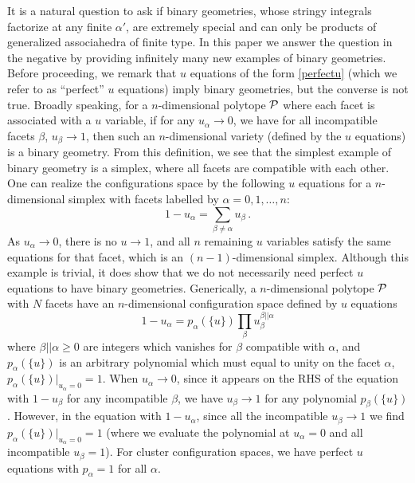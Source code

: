 \documentclass[hidelinks,12pt]{article}
\newcommand{\be}{\begin{equation}}
\newcommand{\ee}{\end{equation}}
\def\be{\begin{equation}}
\def\ee{\end{equation}}
\begin{document}
It is a natural question to ask if binary geometries, whose stringy integrals factorize at any finite $\alpha'$, are extremely special and can only be products of generalized associahedra of finite type. In this paper we answer the question in the negative by providing infinitely many new examples of binary geometries. Before proceeding, we remark that $u$ equations of the form \eqref{perfectu} (which we refer to as ``perfect'' $u$ equations) imply binary geometries, but the converse is not true. Broadly speaking, for a $n$-dimensional polytope ${\cal P}$ where each facet is associated with a $u$ variable, if for any $u_\alpha\to 0$, we have for all incompatible facets $\beta$, $u_\beta \to 1$, then such an $n$-dimensional variety (defined by the $u$ equations) is a binary geometry. From this definition, we see that the simplest example of binary geometry is a simplex, where all facets are compatible with each other. One can realize the configurations space by the following $u$ equations for a $n$-dimensional simplex with facets labelled by $\alpha=0,1,\dots, n$:
\[
1-u_\alpha=\sum_{\beta \neq \alpha} u_\beta\,.
\] 
As $u_\alpha\to 0$, there is no $u\to 1$, and all $n$ remaining $u$ variables satisfy the same equations for that facet, which is an $(n{-}1)$-dimensional simplex. Although this example is trivial, it does show that we do not necessarily need perfect $u$ equations to have binary geometries. Generically,  a $n$-dimensional polytope ${\cal P}$ with $N$ facets have an $n$-dimensional configuration space defined by $u$ equations
\be\label{genueq}
1-u_\alpha=p_\alpha(\{u\}) \prod_\beta u_\beta^{\beta||\alpha} 
\ee
where $\beta ||\alpha \geq 0$ are integers which vanishes for $\beta$ compatible with $\alpha$, and $p_\alpha(\{u\})$ is an arbitrary polynomial which must equal to unity on the facet $\alpha$, $p_\alpha (\{u\})|_{u_\alpha=0}=1$. When $u_\alpha \to 0$, since it appears on the RHS of the equation with $1-u_\beta$ for any incompatible $\beta$, we have $u_\beta\to 1$ for any polynomial $p_\beta (\{u\})$. However, in the equation with $1-u_\alpha$, since all the incompatible $u_\beta \to 1$ we find $p_\alpha (\{u\})|_{u_\alpha=0}=1$ (where we evaluate the polynomial at $u_\alpha=0$ and all incompatible $u_\beta=1$). For cluster configuration spaces, we have perfect $u$ equations with $p_\alpha=1$ for all $\alpha$.
\end{document}
